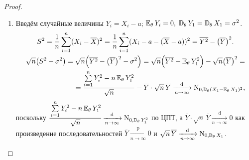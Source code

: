 \begin{proof}
\begin{enumerate}
    \item Введём случайные величины $Y_{i}=X_{i}-a$; $\operatorname{\operatorname{\mathbb{E}}_{\theta}} Y_{i} = 0, \; \operatorname{\mathbb{D}_{\theta}} Y_{1} = \operatorname{\mathbb{D}_{\theta}} X_{1}=\sigma^{2}$.
    \begin{gather*}
        S^{2}=\frac{1}{n} \sum\limits_{i=1}^{n}(X_{i}-\overline{X})^{2}=\frac{1}{n} \sum\limits_{i=1}^{n}(X_{i}-a-(\overline{X}-a))^{2}=\overline{Y^{2}}-\bigl(\overline{Y}\bigr)^{2}. \\
        \begin{aligned}
            \sqrt{n}\bigl(S^{2}-\sigma^{2}\bigr) = \sqrt{n}\Bigl(\overline{Y^{2}}-\bigl(\overline{Y}\bigr)^{2}-\sigma^{2}\Bigr)
            = \sqrt{n}\Bigl(\overline{Y^{2}}-\operatorname{\operatorname{\mathbb{E}}_{\theta}}  Y_{1}^{2} \Bigr) - \sqrt{n}\bigl(\overline{Y}\bigr)^{2} = \\
            =\frac{\sum\limits_{i=1}^{n} Y_{i}^{2}-n \operatorname{\operatorname{\mathbb{E}}_{\theta}}  Y_{1}^{2}}{\sqrt{n}}-\overline{Y} \cdot \sqrt{n} \, \overline{Y} \xrightarrow[n \to \infty]{\text{d}} \operatorname{\mathrm{N}}_{0, \operatorname{\mathbb{D}_{\theta}} (X_{1}-\operatorname{\operatorname{\mathbb{E}}_{\theta}} X_1)^{2}},
    \end{aligned}
    \end{gather*}
    поскольку $\cfrac{\sum\limits_{i=1}^{n} Y_{i}^{2}-n \operatorname{\operatorname{\mathbb{E}}_{\theta}}  Y_{1}^{2}}{\sqrt{n}} \xrightarrow[n \to \infty]{\text{d}} \operatorname{\mathrm{N}}_{0, \operatorname{\mathbb{D}_{\theta}}  Y_{1}^{2}}$ по ЦПТ,
    а ${\overline{Y} \cdot \sqrt{n} \, \overline{Y} \xrightarrow[n \to \infty]{\text{d}} 0}$ как произведение последовательностей ${\overline{Y} \xrightarrow[n \to \infty]{\text{p}} 0}$ и ${\sqrt{n} \, \overline{Y} \xrightarrow[n \to \infty]{\text{d}} \operatorname{\mathrm{N}}_{0, \operatorname{\mathbb{D}_{\theta}}  X_{1}}}$. \qedhere
\end{enumerate}
\end{proof}

